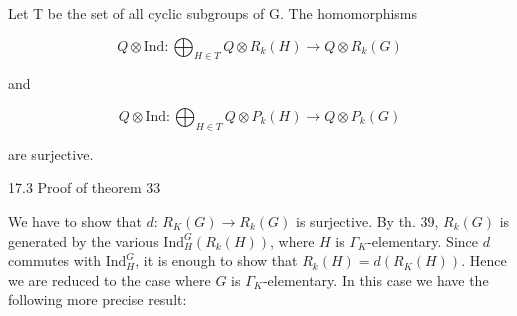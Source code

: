 Let T be the set of all cyclic subgroups of G. The homomorphisms

$$Q \otimes \text{Ind} : \bigoplus_{H \in T} Q \otimes R_k(H) \rightarrow Q \otimes R_k(G)$$

and

$$Q \otimes \text{Ind} : \bigoplus_{H \in T} Q \otimes P_k(H) \rightarrow Q \otimes P_k(G)$$

are surjective.

17.3 Proof of theorem 33

We have to show that $d$: $R_K(G) \rightarrow R_k(G)$ is surjective. By th. 39, $R_k(G)$ is generated by the various $\text{Ind}_H^G(R_k(H))$, where $H$ is $\Gamma_K$-elementary. Since $d$ commutes with $\text{Ind}_H^G$, it is enough to show that $R_k(H) = d(R_K(H))$. Hence we are reduced to the case where $G$ is $\Gamma_K$-elementary. In this case we have the following more precise result:
